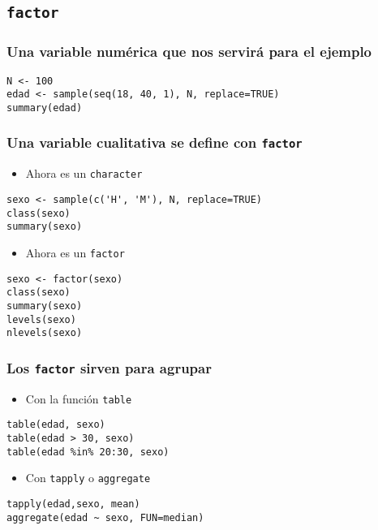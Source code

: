 \documentclass[xcolor={usenames,svgnames,dvipsnames}]{beamer}
\begin{document}
\subsection{\texttt{factor}}
\label{sec-5-1}
\begin{frame}[fragile]
\frametitle{Una variable numérica que nos servirá para el ejemplo}
\label{sec-5-1-1}


\lstset{language=R}
\begin{lstlisting}
N <- 100
edad <- sample(seq(18, 40, 1), N, replace=TRUE)
summary(edad)
\end{lstlisting}
\end{frame}
\begin{frame}[fragile]
\frametitle{Una variable cualitativa se define con \texttt{factor}}
\label{sec-5-1-2}

\begin{itemize}
\item Ahora es un \texttt{character}
\end{itemize}

\lstset{language=R}
\begin{lstlisting}
sexo <- sample(c('H', 'M'), N, replace=TRUE)
class(sexo)
summary(sexo)
\end{lstlisting}
\begin{itemize}
\item Ahora es un \texttt{factor}
\end{itemize}

\lstset{language=R}
\begin{lstlisting}
sexo <- factor(sexo)
class(sexo)
summary(sexo)
levels(sexo)
nlevels(sexo)
\end{lstlisting}
\end{frame}
\begin{frame}[fragile]
\frametitle{Los \texttt{factor} sirven para agrupar}
\label{sec-5-1-3}


\begin{itemize}
\item Con la función \texttt{table}
\end{itemize}

\lstset{language=R}
\begin{lstlisting}
table(edad, sexo)
table(edad > 30, sexo)
table(edad %in% 20:30, sexo)
\end{lstlisting}

\begin{itemize}
\item Con \texttt{tapply} o \texttt{aggregate}
\end{itemize}

\lstset{language=R}
\begin{lstlisting}
tapply(edad,sexo, mean)
aggregate(edad ~ sexo, FUN=median)
\end{lstlisting}
\end{frame}
\end{document}
